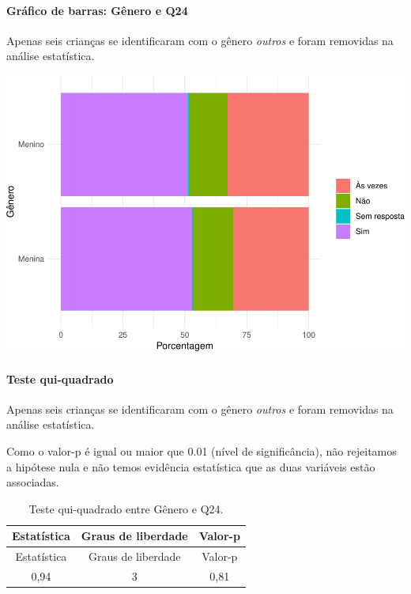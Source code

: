 \documentclass[]{article}
\let\oldparagraph\paragraph
\renewcommand{\paragraph}[1]{\oldparagraph{#1}\mbox{}}
\begin{document}
\hypertarget{gruxe1fico-de-barras-guxeanero-e-q24}{%
\paragraph{Gráfico de barras: Gênero e Q24}\label{gruxe1fico-de-barras-guxeanero-e-q24}}

Apenas seis crianças se identificaram com o gênero \emph{outros} e foram removidas na análise estatística.

\begin{center}\includegraphics[width=0.75\linewidth]{relatorio_covid19_files/figure-latex/unnamed-chunk-613-1} \end{center}

\hypertarget{teste-qui-quadrado-53}{%
\paragraph{Teste qui-quadrado}\label{teste-qui-quadrado-53}}

Apenas seis crianças se identificaram com o gênero \emph{outros} e foram removidas na análise estatística.

Como o valor-p é igual ou maior que 0.01 (nível de significância), não rejeitamos a hipótese nula e não temos evidência estatística que as duas variáveis estão associadas.

\begin{longtable}[]{@{}ccc@{}}
\caption{\label{tab:unnamed-chunk-615}Teste qui-quadrado entre Gênero e Q24.}\tabularnewline
\toprule
Estatística & Graus de liberdade & Valor-p\tabularnewline
\midrule
\endfirsthead
\toprule
Estatística & Graus de liberdade & Valor-p\tabularnewline
\midrule
\endhead
0,94 & 3 & 0,81\tabularnewline
\bottomrule
\end{longtable}

\cleardoublepage
\end{document}
